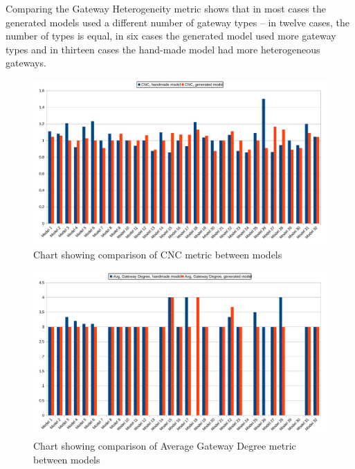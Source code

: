Comparing the Gateway Heterogeneity metric shows that in most cases the generated models used a different number of gateway types -- in twelve cases, the number of types is equal, in six cases the generated model used more gateway types and in thirteen cases the hand-made model had more heterogeneous gateways.
\begin{figure}[p]
	\centering
	\includegraphics[width=0.95\textheight, angle=90]{./images/cnc_chart.pdf}
	\caption{Chart showing comparison of CNC metric between models}
	\label{bpmn:cnc_chart}
\end{figure}
\begin{figure}[p]
	\centering
	\includegraphics[width=0.95\textheight, angle=90]{./images/avg_chart.pdf}
	\caption{Chart showing comparison of Average Gateway Degree metric between models}
	\label{bpmn:avg_chart}
\end{figure}
